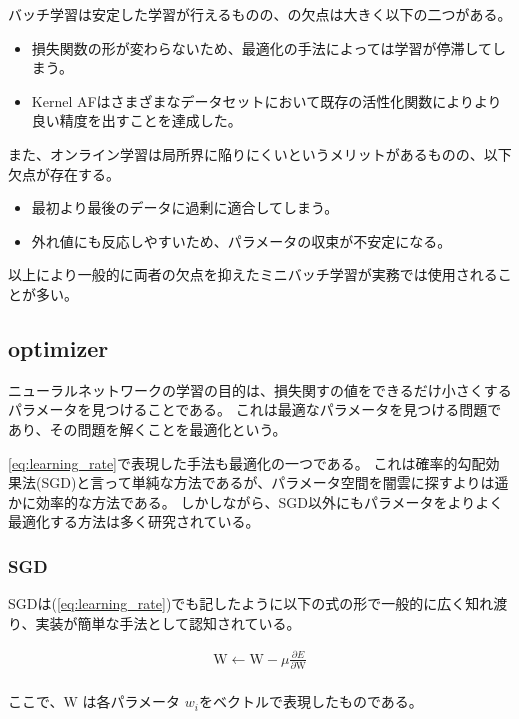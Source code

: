 バッチ学習は安定した学習が行えるものの、の欠点は大きく以下の二つがある。

\begin{itemize}
  \item 損失関数の形が変わらないため、最適化の手法によっては学習が停滞してしまう。
  \item Kernel AFはさまざまなデータセットにおいて既存の活性化関数によりより良い精度を出すことを達成した。
\end{itemize}

また、オンライン学習は局所界に陥りにくいというメリットがあるものの、以下欠点が存在する。

\begin{itemize}
  \item 最初より最後のデータに過剰に適合してしまう。
  \item 外れ値にも反応しやすいため、パラメータの収束が不安定になる。
\end{itemize}

以上により一般的に両者の欠点を抑えたミニバッチ学習が実務では使用されることが多い。


\subsection{optimizer}
ニューラルネットワークの学習の目的は、損失関すの値をできるだけ小さくするパラメータを見つけることである。
これは最適なパラメータを見つける問題であり、その問題を解くことを最適化という。

\ref{eq:learning_rate}で表現した手法も最適化の一つである。
これは確率的勾配効果法(SGD)と言って単純な方法であるが、パラメータ空間を闇雲に探すよりは遥かに効率的な方法である。
しかしながら、SGD以外にもパラメータをよりよく最適化する方法は多く研究されている。

\subsubsection{SGD}
SGDは(\ref{eq:learning_rate})でも記したように以下の式の形で一般的に広く知れ渡り、実装が簡単な手法として認知されている。

\begin{eqnarray}
\mathrm{W} \leftarrow \mathrm{W} - \mu \frac{\partial E}{\partial \mathrm{W}} \\
\label{eq:norm uneq}
\end{eqnarray}

ここで、$ \mathrm{W} $ は各パラメータ $ w_i $をベクトルで表現したものである。

